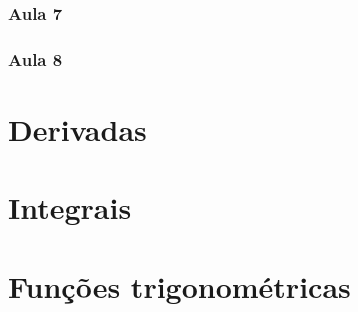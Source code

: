 \documentclass[
	12pt,				%
	openright,			%
	twoside,			%
	a4paper,			%
	english,			%
	french,				%
	spanish,			%
	brazil,				%
]{abntex2}
\begin{document}
		\subsection{Aula 7}
			
		\subsection{Aula 8}
			

\postextual




\begin{anexosenv}
	
	\partanexos
	
	\chapter{Derivadas}
	\label{anexo_derivadas}
	
	
	\chapter{Integrais}
	
	\label{anexo_integrais}
	
	
	\chapter{Funções trigonométricas}
	
	\label{anexo_funcoes_trigonometricas}
	
	
\end{anexosenv}



\printindex
\end{document}
